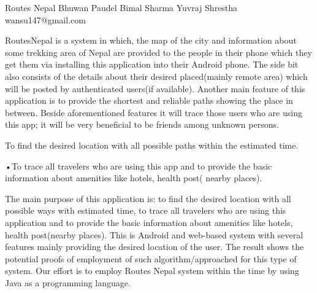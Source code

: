  \begin{conf-abstract}[]
 {Routes Nepal}
 {Bhuwan Paudel
 	Bimal Sharma
 	Yuvraj Shrestha
 }
{wansu147@gmail.com}

RoutesNepal is a system in which, the map of the city and information about some trekking area of Nepal are provided to the people in their phone which they get them via installing this application into their Android phone. The side bit also consists of the details about their desired placed(mainly remote area) which will be posted by authenticated users(if available). Another main feature of this application is to provide the shortest and reliable paths showing the place in between. Beside aforementioned features it will trace those users who are using this app; it will be very beneficial to be friends among unknown persons. 

To find the desired location with all possible paths within the estimated time. 

•To trace all travelers who are using this app and to provide the basic information about amenities like hotels, health post( nearby places).

The main purpose of this application is: to find the desired location with all possible ways with estimated time, to trace all travelers who are using this application and to provide the basic information about amenities like hotels, health post(nearby places). This is Android and web-based system with several features mainly providing the desired location of the user. The result shows the potential proofs of employment of such algorithm/approached for this type of system. Our effort is to employ Routes Nepal system within the time by using Java as a programming language.
 \end{conf-abstract}
